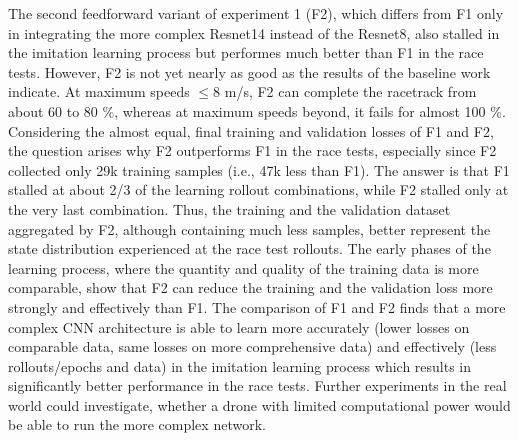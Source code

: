 The second feedforward variant of experiment 1 (F2),
which differs from F1 only in integrating the more complex Resnet14 instead of the Resnet8,
also stalled in the imitation learning process but 
performes much better than F1 in the race tests.
However, F2 is not yet nearly as good as the results of the baseline work indicate.
At maximum speeds $\le 8$ m/s, F2 can complete the racetrack from about 60 to 80 \%,
whereas at maximum speeds beyond, it fails for almost 100 \%.
Considering the almost equal, final training and validation losses of F1 and F2, 
the question arises why F2 outperforms F1 in the race tests,
especially since F2 collected only 29k training samples (i.e., 47k less than F1).
The answer is that F1 stalled at about 2/3 of the learning rollout combinations,
while F2 stalled only at the very last combination.
Thus, the training and the validation dataset aggregated by F2,
although containing much less samples,
better represent the state distribution experienced at the race test rollouts.
The early phases of the learning process,
where the quantity and quality of the training data is more comparable,
show that F2 can reduce the training and the validation loss more strongly and effectively than F1.
The comparison of F1 and F2
finds that a more complex CNN architecture
is able to learn more accurately
(lower losses on comparable data, same losses on more comprehensive data)
and effectively 
(less rollouts/epochs and data)
in the imitation learning process
which results in significantly better performance in the race tests.
Further experiments in the real world
could investigate, whether a drone with limited computational power 
would be able to run the more complex network.


